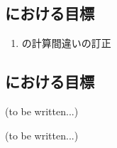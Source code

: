 \subsection{\EndFaceBoringMilling における目標}
\begin{enumerate}
\item \EndFaceBoringWidth の計算間違いの訂正
\end{enumerate}


\subsection{\IncutBoringMilling における目標\TBW}
(to be written...)



\clearpage
(to be written...)
